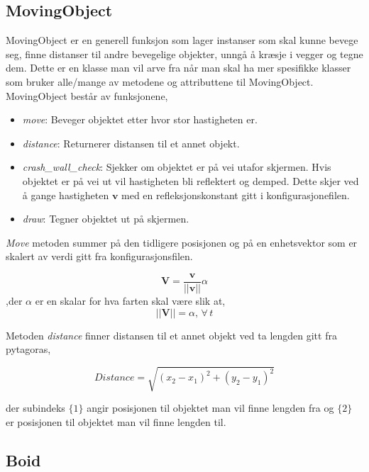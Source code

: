 \documentclass[10pt]{article}
\newcommand{\vect}[1]{\boldsymbol{#1}}
\begin{document}
{\subsection{MovingObject}

MovingObject er en generell funksjon som lager instanser som skal kunne bevege seg, finne distanser til andre bevegelige objekter, unngå å kræsje i vegger og tegne dem.
Dette er en klasse man vil arve fra når man skal ha mer spesifikke klasser som bruker alle/mange av metodene og attributtene til MovingObject.
MovingObject består av funksjonene,

\begin{itemize}
    \item \emph{move}: Beveger objektet etter hvor stor hastigheten er.
    \item \emph{distance}: Returnerer distansen til et annet objekt.
    \item \emph{crash\_wall\_check}: Sjekker om objektet er på vei utafor skjermen. Hvis objektet er på vei ut vil hastigheten bli reflektert og demped. Dette skjer ved å gange hastigheten $\vect{v}$ med en refleksjonskonstant gitt i konfigurasjonefilen.
    \item \emph{draw}: Tegner objektet ut på skjermen.
\end{itemize}

\emph{Move} metoden summer på den tidligere posisjonen og på en enhetsvektor som er skalert av verdi gitt fra konfigurasjonsfilen.

\begin{equation}
    \vect{V} = \frac{\vect{v}}{||\vect{v}||}\alpha
\end{equation}
,der $\alpha$ er en skalar for hva farten skal være slik at,
\begin{equation}
     ||\vect{V}|| = \alpha, \, \forall\,t
\end{equation}

Metoden \emph{distance} finner distansen til et annet objekt ved ta lengden gitt fra pytagoras,

\begin{equation*}
    Distance = \sqrt{(x_{2} - x_{1})^2 + (y_{2} - y_{1})^2}
\end{equation*}

der subindeks $\{1\}$ angir posisjonen til objektet man vil finne lengden fra og $\{2\}$ er posisjonen til objektet man vil finne lengden til.

\subsection{Boid}

}
\end{document}
